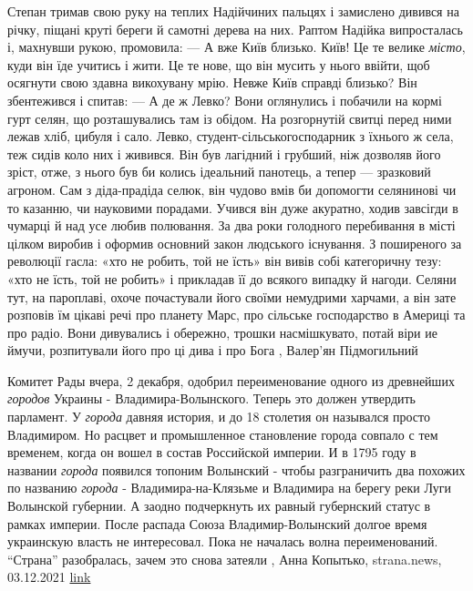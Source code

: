 Степан тримав свою руку на теплих Надійчиних пальцях і замислено дивився на
річку, піщані круті береги й самотні дерева на них. Раптом Надійка випросталась
і, махнувши рукою, промовила: — А вже Київ близько.  Київ! Це те велике \emph{місто},
куди він їде учитись і жити. Це те нове, що він мусить у нього ввійти, щоб
осягнути свою здавна викохувану мрію. Невже Київ справді близько? Він
збентежився і спитав: — А де ж Левко?  Вони оглянулись і побачили на кормі гурт
селян, що розташувались там із обідом.  На розгорнутій свитці перед ними лежав
хліб, цибуля і сало. Левко, студент-сільськогосподарник з їхнього ж села, теж
сидів коло них і живився. Він був лагідний і грубший, ніж дозволяв його зріст,
отже, з нього був би колись ідеальний панотець, а тепер — зразковий агроном.
Сам з діда-прадіда селюк, він чудово вмів би допомогти селянинові чи то
казанню, чи науковими порадами.  Учився він дуже акуратно, ходив завсігди в
чумарці й над усе любив полювання.  За два роки голодного перебивання в місті
цілком виробив і оформив основний закон людського існування. З поширеного за
революції гасла: «хто не робить, той не їсть» він вивів собі категоричну тезу:
«хто не їсть, той не робить» і прикладав її до всякого випадку й нагоди. Селяни
тут, на пароплаві, охоче почастували його своїми немудрими харчами, а він зате
розповів їм цікаві речі про планету Марс, про сільське господарство в Америці
та про радіо. Вони дивувались і обережно, трошки насмішкувато, потай віри ие
ймучи, розпитували його про ці дива і про Бога
, Валер'ян Підмогильний

Комитет Рады вчера, 2 декабря, одобрил переименование одного из древнейших
\emph{городов} Украины - Владимира-Волынского. Теперь это должен утвердить парламент.
У \emph{города} давняя история, и до 18 столетия он назывался просто Владимиром. Но
расцвет и промышленное становление города совпало с тем временем, когда он
вошел в состав Российской империи. И в 1795 году в названии \emph{города} появился
топоним Волынский - чтобы разграничить два похожих по названию \emph{города} -
Владимира-на-Клязьме и Владимира на берегу реки Луги Волынской губернии. 
А заодно подчеркнуть их равный губернский статус в рамках империи. 
После распада Союза Владимир-Волынский долгое время украинскую власть не
интересовал. Пока не началась волна переименований.
\enquote{Страна} разобралась, зачем это снова затеяли
, 
Анна Копытько, strana.news, 03.12.2021
\href{https://strana.news/news/355751-vladimir-volynskij-pereimenujut-kohda-i-kak.html}{link}
